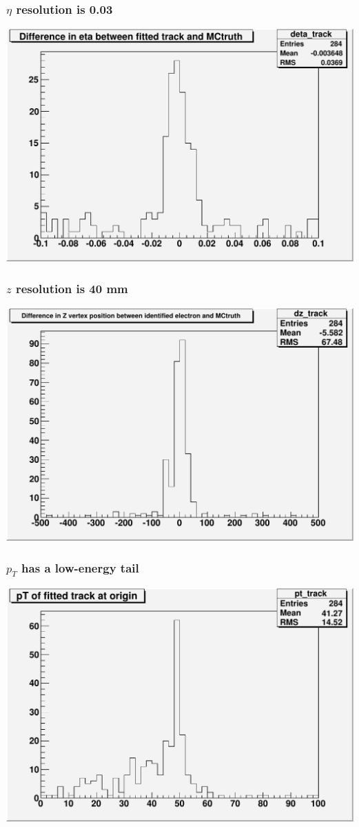 \documentclass[12pt,compress]{beamer}
\begin{document}
\begin{frame}
\frametitle{$\eta$ resolution is 0.03}
\begin{center}
\includegraphics[width=0.8\linewidth]{deta_track}
\end{center}
\end{frame}

\begin{frame}
\frametitle{$z$ resolution is 40 mm}
\begin{center}
\includegraphics[width=0.8\linewidth]{dz_track}
\end{center}
\end{frame}

\begin{frame}
\frametitle{$p_T$ has a low-energy tail}
\begin{center}
\includegraphics[width=0.8\linewidth]{pt_track}
\end{center}
\end{frame}
\end{document}
